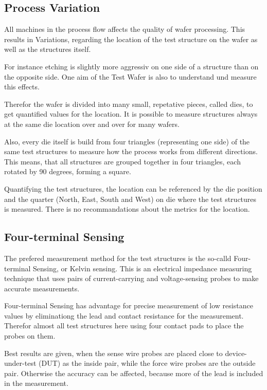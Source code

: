 \subsection{Process Variation}

All machines in the process flow affects the quality of wafer processing.
This results in Variations, regarding the location of the test structure on the wafer as well as the structures itself.

For instance etching is slightly more aggressiv on one side of a structure than on the opposite side.
One aim of the Test Wafer is also to understand und measure this effects.

Therefor the wafer is divided into many small, repetative pieces, called dies, to get quantified values for the location.
It is possible to measure structures always at the same die location over and over for many wafers.

Also, every die itself is build from four triangles (representing one side) of the same test structures to measure how the process works from different directions.
This means, that all structures are grouped together in four triangles, each rotated by 90 degrees, forming a square.



Quantifying the test structures, the location can be referenced by the die position and the quarter (North, East, South and West) on die where the test structures is measured.
There is no recommandations about the metrics for the location.

\subsection{Four-terminal Sensing}

The prefered measurement method for the test structures is the so-calld Four-terminal Sensing, or Kelvin sensing.
This is an electrical impedance measuring technique that uses pairs of current-carrying and voltage-sensing probes to make accurate measurements.

Four-terminal Sensing has advantage for precise measurement of low resistance values by eliminationg the lead and contact resistance for the measurement.
Therefor almost all test structures here using four contact pads to place the probes on them.



Best results are given, when the sense wire probes are placed close to device-under-test (DUT) as the inside pair, while the force wire probes are the outside pair.
Otherwise the accuracy can be affected, because more of the lead is included in the measurement.

